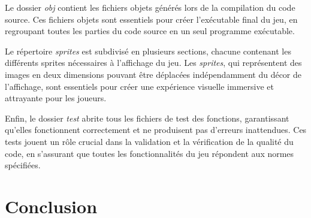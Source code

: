 \documentclass[10pt]{article}
\begin{document}
\begin{center}
Le dossier \textit{obj} contient les fichiers objets générés lors de la compilation du code source. Ces fichiers objets sont essentiels pour créer l'exécutable final du jeu, en regroupant toutes les parties du code source en un seul programme exécutable.

Le répertoire \textit{sprites} est subdivisé en plusieurs sections, chacune contenant les différents sprites nécessaires à l'affichage du jeu. Les \textit{\gls{sprites}}, qui représentent des images en deux dimensions pouvant être déplacées indépendamment du décor de l'affichage, sont essentiels pour créer une expérience visuelle immersive et attrayante pour les joueurs.

Enfin, le dossier \textit{test} abrite tous les fichiers de test des fonctions, garantissant qu'elles fonctionnent correctement et ne produisent pas d'erreurs inattendues. Ces tests jouent un rôle crucial dans la validation et la vérification de la qualité du code, en s'assurant que toutes les fonctionnalités du jeu répondent aux normes spécifiées.

\clearpage
\section{Conclusion}


\end{center}
\end{document}
